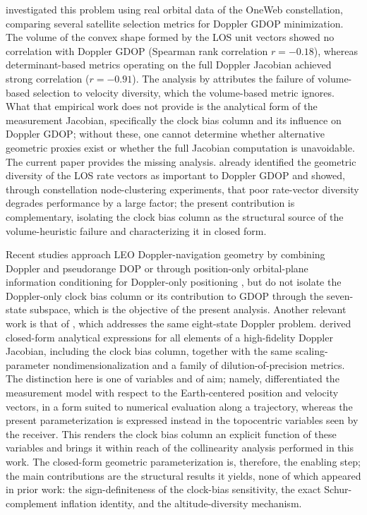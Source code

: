 \documentclass[letterpaper,times]{IONconf-v2}
\theoremstyle{plain}
\theoremstyle{remark}
\begin{document}
\textcite{Moore2024} investigated this problem using real orbital data of the OneWeb constellation, comparing several satellite selection metrics for Doppler GDOP minimization. The volume of the convex shape formed by the LOS unit vectors showed no correlation with Doppler GDOP (Spearman rank correlation $r = -0.18$), whereas determinant-based metrics operating on the full Doppler Jacobian achieved strong correlation ($r = -0.91$). The analysis by \textcite{Moore2024} attributes the failure of volume-based selection to velocity diversity, which the volume-based metric ignores. What that empirical work does not provide is the analytical form of the measurement Jacobian, specifically the clock bias column and its influence on Doppler GDOP; without these, one cannot determine whether alternative geometric proxies exist or whether the full Jacobian computation is unavoidable. The current paper provides the missing analysis. \textcite{Psiaki2021} already identified the geometric diversity of the LOS rate vectors as important to Doppler GDOP and showed, through constellation node-clustering experiments, that poor rate-vector diversity degrades performance by a large factor; the present contribution is complementary, isolating the clock bias column as the structural source of the volume-heuristic failure and characterizing it in closed form.

Recent studies approach LEO Doppler-navigation geometry by combining Doppler and pseudorange DOP \parencite{McLemoreDoP2022} or through position-only orbital-plane information conditioning for Doppler-only positioning \parencite{Thornton2026}, but do not isolate the Doppler-only clock bias column or its contribution to GDOP through the seven-state subspace, which is the objective of the present analysis. Another relevant work is that of \textcite{Baron2024}, which addresses the same eight-state Doppler problem. \textcite{Baron2024} derived closed-form analytical expressions for all elements of a high-fidelity Doppler Jacobian, including the clock bias column, together with the same scaling-parameter nondimensionalization and a family of dilution-of-precision metrics. The distinction here is one of variables and of aim; namely, \textcite{Baron2024} differentiated the measurement model with respect to the Earth-centered position and velocity vectors, in a form suited to numerical evaluation along a trajectory, whereas the present parameterization is expressed instead in the topocentric variables seen by the receiver. This renders the clock bias column an explicit function of these variables and brings it within reach of the collinearity analysis performed in this work. The closed-form geometric parameterization is, therefore, the enabling step; the main contributions are the structural results it yields, none of which appeared in prior work: the sign-definiteness of the clock-bias sensitivity, the exact Schur-complement inflation identity, and the altitude-diversity mechanism.
\end{document}
